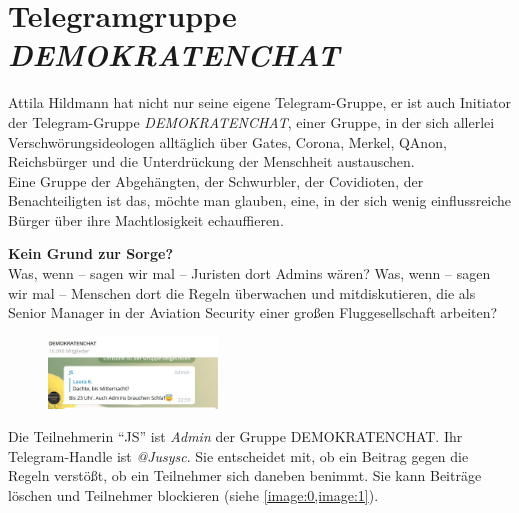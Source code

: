 \section{Telegramgruppe \textit{DEMOKRATENCHAT}}
Attila Hildmann hat nicht nur seine eigene Telegram-Gruppe, er ist auch Initiator der Telegram-Gruppe \textit{DEMOKRATENCHAT\autocite{Telegram:demokratenchat3}}, einer Gruppe, in der sich allerlei Verschwörungsideologen alltäglich über Gates, Corona, Merkel, QAnon, Reichsbürger und die Unterdrückung der Menschheit austauschen.\\
Eine Gruppe der Abgehängten, der Schwurbler, der Covidioten, der Benachteiligten ist das, möchte man glauben, eine, in der sich wenig einflussreiche Bürger über ihre Machtlosigkeit echauffieren.

  \textbf{Kein Grund zur Sorge?}\\
  Was, wenn – sagen wir mal – Juristen dort Admins wären? Was, wenn – sagen wir mal – Menschen dort die Regeln überwachen und mitdiskutieren, die als Senior Manager in der Aviation Security einer großen Fluggesellschaft arbeiten?

  \begin{figure}\centering  \vspace{-10pt}
    \includegraphics[width=0.4\textwidth]{images/image--000.jpg}
    \caption{}\label{image:0}
  \end{figure}
Die Teilnehmerin ``{JS}'' ist \textit{Admin} der Gruppe DEMOKRATENCHAT. Ihr Telegram-Handle ist \emph{@Jusysc}. Sie entscheidet mit, ob ein Beitrag gegen die Regeln verstößt, ob ein Teilnehmer sich daneben benimmt. Sie kann Beiträge löschen und Teilnehmer blockieren (siehe \cref{image:0,image:1}).\\


